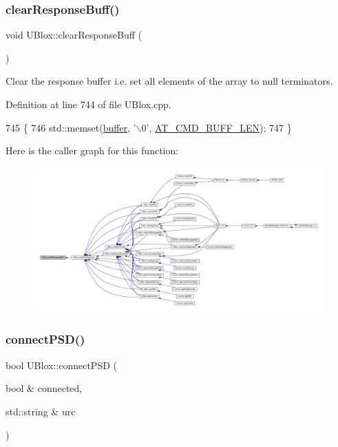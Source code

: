 \subsubsection{\texorpdfstring{clear\+Response\+Buff()}{clearResponseBuff()}}
{\footnotesize\ttfamily void U\+Blox\+::clear\+Response\+Buff (\begin{DoxyParamCaption}{ }\end{DoxyParamCaption})\hspace{0.3cm}{\ttfamily [private]}}

Clear the response buffer i.\+e. set all elements of the array to null terminators. 

Definition at line 744 of file U\+Blox.\+cpp.


\begin{DoxyCode}
745 \{
746     std::memset(\hyperlink{class_u_blox_a6ca4b90f3dc4e856181dce1ebda6f82c}{buffer}, \textcolor{charliteral}{'\(\backslash\)0'}, \hyperlink{_u_blox_8h_aad458adf8f40cbcc1074061f226a112e}{AT\_CMD\_BUFF\_LEN});
747 \}
\end{DoxyCode}
Here is the caller graph for this function\+:
\nopagebreak
\begin{figure}[H]
\begin{center}
\leavevmode
\includegraphics[width=350pt]{da/df6/class_u_blox_afc846fbcb1cbd49057b5ce39cd0e0dd6_icgraph}
\end{center}
\end{figure}
\mbox{\label{class_u_blox_ac250bd4aea14e09b3a2595c2b8eda18a}} 
\subsubsection{\texorpdfstring{connect\+P\+S\+D()}{connectPSD()}}
{\footnotesize\ttfamily bool U\+Blox\+::connect\+P\+SD (\begin{DoxyParamCaption}\item[{bool \&}]{connected,  }\item[{std\+::string \&}]{urc }\end{DoxyParamCaption})}

